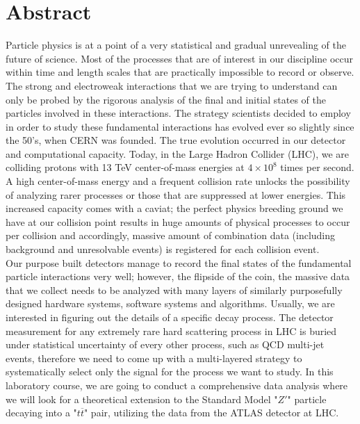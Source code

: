 \section*{Abstract}

Particle physics is at a point of a very statistical and gradual unrevealing of the future of science. Most of the processes that are of interest in our discipline occur within time and length scales that are practically impossible to record or observe. The strong and electroweak interactions that we are trying to understand can only be probed by the rigorous analysis of the final and initial states of the particles involved in these interactions. The strategy scientists decided to employ in order to study these fundamental interactions has evolved ever so slightly since the 50's, when CERN was founded. The true evolution occurred in our detector and computational capacity. Today, in the Large Hadron Collider (LHC), we are colliding protons with 13 TeV center-of-mass energies at \( 4 \times 10^{8} \) times per second. A high center-of-mass energy and a frequent collision rate unlocks the possibility of analyzing rarer processes or those that are suppressed at lower energies. This increased capacity comes with a caviat; the perfect physics breeding ground we have at our collision point results in huge amounts of physical processes to occur per collision and accordingly, massive amount of combination data (including background and unresolvable events) is registered for each collision event.\\

Our purpose built detectors manage to record the final states of the fundamental particle interactions very well; however, the flipside of the coin, the massive data that we collect needs to be analyzed with many layers of similarly purposefully designed hardware systems, software systems and algorithms. Usually, we are interested in figuring out the details of a specific decay process. The detector measurement for any extremely rare hard scattering process in LHC is buried under statistical uncertainty of every other process, such as QCD multi-jet events, therefore we need to come up with a multi-layered strategy to systematically select only the signal for the process we want to study. In this laboratory course, we are going to conduct a comprehensive data analysis where we will look for a theoretical extension to the Standard Model "$Z'$" particle decaying into a "$t\overline{t}$" pair, utilizing the data from the ATLAS detector at LHC.